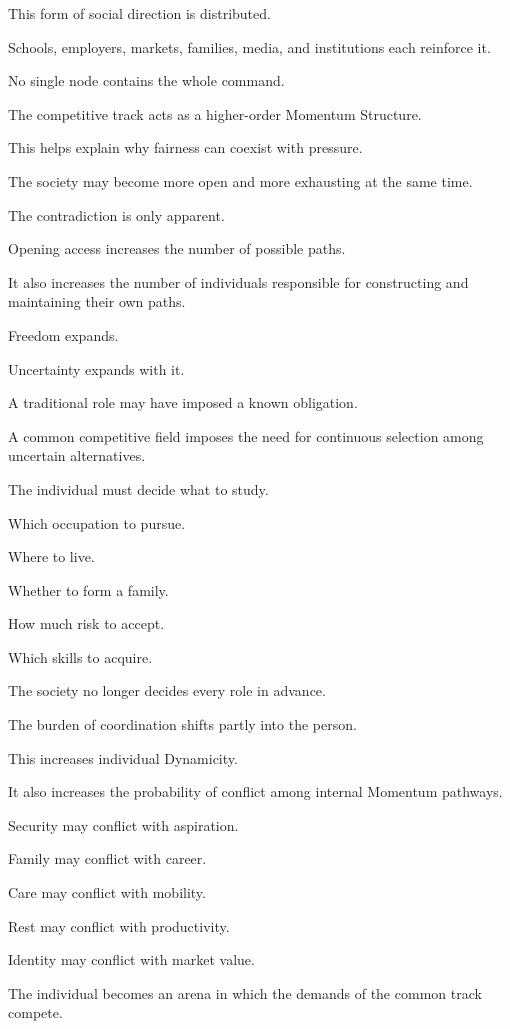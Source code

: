 This form of social direction is distributed.

Schools, employers, markets, families, media, and institutions each reinforce it.

No single node contains the whole command.

The competitive track acts as a higher-order Momentum Structure.

This helps explain why fairness can coexist with pressure.

The society may become more open and more exhausting at the same time.

The contradiction is only apparent.

Opening access increases the number of possible paths.

It also increases the number of individuals responsible for constructing and maintaining their own paths.

Freedom expands.

Uncertainty expands with it.

A traditional role may have imposed a known obligation.

A common competitive field imposes the need for continuous selection among uncertain alternatives.

The individual must decide what to study.

Which occupation to pursue.

Where to live.

Whether to form a family.

How much risk to accept.

Which skills to acquire.

The society no longer decides every role in advance.

The burden of coordination shifts partly into the person.

This increases individual Dynamicity.

It also increases the probability of conflict among internal Momentum pathways.

Security may conflict with aspiration.

Family may conflict with career.

Care may conflict with mobility.

Rest may conflict with productivity.

Identity may conflict with market value.

The individual becomes an arena in which the demands of the common track compete.

